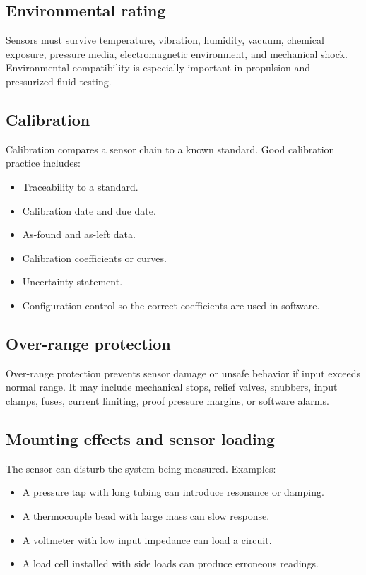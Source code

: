 \documentclass[11pt]{article}
\begin{document}
\subsection{Environmental rating}
Sensors must survive temperature, vibration, humidity, vacuum, chemical
exposure, pressure media, electromagnetic environment, and mechanical shock.
Environmental compatibility is especially important in propulsion and
pressurized-fluid testing.

\subsection{Calibration}
Calibration compares a sensor chain to a known standard. Good calibration
practice includes:
\begin{itemize}
  \item Traceability to a standard.
  \item Calibration date and due date.
  \item As-found and as-left data.
  \item Calibration coefficients or curves.
  \item Uncertainty statement.
  \item Configuration control so the correct coefficients are used in software.
\end{itemize}

\subsection{Over-range protection}
Over-range protection prevents sensor damage or unsafe behavior if input exceeds
normal range. It may include mechanical stops, relief valves, snubbers, input
clamps, fuses, current limiting, proof pressure margins, or software alarms.

\subsection{Mounting effects and sensor loading}
The sensor can disturb the system being measured. Examples:
\begin{itemize}
  \item A pressure tap with long tubing can introduce resonance or damping.
  \item A thermocouple bead with large mass can slow response.
  \item A voltmeter with low input impedance can load a circuit.
  \item A load cell installed with side loads can produce erroneous readings.
\end{itemize}
\end{document}
